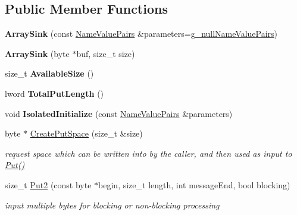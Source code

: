 \subsection*{Public Member Functions}
\begin{DoxyCompactItemize}
\item 
\hypertarget{class_array_sink_a70d9e1c3231cb190831fd16e132ace2b}{
{\bfseries ArraySink} (const \hyperlink{class_name_value_pairs}{NameValuePairs} \&parameters=\hyperlink{cryptlib_8h_ab1b0f7d11a21c6163be8ca2662ce2ac6}{g\_\-nullNameValuePairs})}
\label{class_array_sink_a70d9e1c3231cb190831fd16e132ace2b}

\item 
\hypertarget{class_array_sink_a2651a72ad26f0ced19013a425195e0e1}{
{\bfseries ArraySink} (byte $\ast$buf, size\_\-t size)}
\label{class_array_sink_a2651a72ad26f0ced19013a425195e0e1}

\item 
\hypertarget{class_array_sink_a8a0b2bc344136755ae7edc83cea078cc}{
size\_\-t {\bfseries AvailableSize} ()}
\label{class_array_sink_a8a0b2bc344136755ae7edc83cea078cc}

\item 
\hypertarget{class_array_sink_a36374569bfaf3711c3a7a306a46ea6d9}{
lword {\bfseries TotalPutLength} ()}
\label{class_array_sink_a36374569bfaf3711c3a7a306a46ea6d9}

\item 
\hypertarget{class_array_sink_a0b677032fc5455f0ad134d4271ac40c3}{
void {\bfseries IsolatedInitialize} (const \hyperlink{class_name_value_pairs}{NameValuePairs} \&parameters)}
\label{class_array_sink_a0b677032fc5455f0ad134d4271ac40c3}

\item 
byte $\ast$ \hyperlink{class_array_sink_a10b95ee17a2b7763757b021de0172f5f}{CreatePutSpace} (size\_\-t \&size)
\begin{DoxyCompactList}\small\item\em request space which can be written into by the caller, and then used as input to \hyperlink{class_buffered_transformation_ae70658b0d271f8e114ac6c3cc9774ede}{Put()} \item\end{DoxyCompactList}\item 
size\_\-t \hyperlink{class_array_sink_a2e29344d51a7912e0a88dde1ae4ca556}{Put2} (const byte $\ast$begin, size\_\-t length, int messageEnd, bool blocking)
\begin{DoxyCompactList}\small\item\em input multiple bytes for blocking or non-\/blocking processing \item\end{DoxyCompactList}\end{DoxyCompactItemize}
